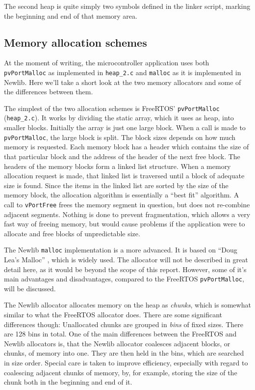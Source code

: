 The second heap is quite simply two symbols defined in the linker script, marking the beginning and end of that memory area.


\subsection{Memory allocation schemes}
At the moment of writing, the microcontroller application uses both \texttt{pvPortMalloc} as implemented in \texttt{heap\_2.c} and \texttt{malloc} as it is implemented in Newlib. Here we'll take a short look at the two memory allocators and some of the differences between them.

The simplest of the two allocation schemes is FreeRTOS' \texttt{pvPortMalloc} (\texttt{heap\_2.c}). It works by dividing the static array, which it uses as heap, into smaller blocks. Initially the array is just one large block. When a call is made to \texttt{pvPortMalloc}, the large block is split. The block sizes depends on how much memory is requested. Each memory block has a header which contains the size of that particular block and the address of the header of the next free block. The headers of the memory blocks form a linked list structure. When a memory allocation request is made, that linked list is traversed until a block of adequate size is found. Since the items in the linked list are sorted by the size of the memory block, the allocation algorithm is essentially a ``best fit'' algorithm. A call to \texttt{vPortFree} frees the memory segment in question, but does not re-combine adjacent segments. Nothing is done to prevent fragmentation, which allows a very fast way of freeing memory, but would cause problems if the application were to allocate and free blocks of unpredictable size.

The Newlib \texttt{malloc} implementation is a more advanced. It is based on ``Doug Lea's Malloc'' \cite{dlmalloc}, which is widely used. The allocator will not be described in great detail here, as it would be beyond the scope of this report. However, some of it's main advantages and disadvantages, compared to the FreeRTOS \texttt{pvPortMalloc}, will be discussed.

The Newlib allocator allocates memory on the heap as \textit{chunks}, which is somewhat similar to what the FreeRTOS allocator does. There are some significant differences though: Unallocated chunks are grouped in \textit{bins} of fixed sizes. There are 128 bins in total. One of the main differences between the FreeRTOS and Newlib allocators is, that the Newlib allocator coalesces adjacent blocks, or chunks, of memory into one. They are then held in the bins, which are searched in size order. Special care is taken to improve efficiency, especially with regard to coalescing adjacent chunks of memory, by, for example, storing the size of the chunk both in the beginning and end of it.

